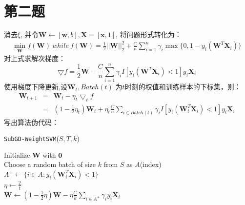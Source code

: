 \documentclass[UTF8]{ctexart}
\begin{document}
\newpage
\section{第二题}
\noindent
消去$\xi$, 并令$\textbf{W}\leftarrow[\textbf{w}, b], \textbf{X}=[\textbf{x}, 1]$,
将问题形式转化为：
\begin{eqnarray}
        \mathop{\min}_{\textbf{W}} f(\textbf{W})\ while\ f(\textbf{W}) = 
        \frac{1}{2} || \textbf{W}||^2_2 + 
        \frac{C}{n} \sum_{i=1}^{n} 
        \gamma_i \max \{ 0, 1-y_i(\textbf{W}^T\textbf{X}_i)\}
\end{eqnarray}
\noindent
对上式求解次梯度：
\begin{equation}
        \bigtriangledown f = \frac{1}{2} \textbf{W} -
        \frac{C}{n} \sum_{i=1}^{n} 
        \gamma_i I[y_i(\textbf{W}^T\textbf{X}_i)<1]y_i\textbf{X}_i
\end{equation}
\noindent
使用梯度下降更新,设$\textbf{W}_t, Batch(t)$ 为$t$时刻的权值和训练样本的下标集，则：
\begin{eqnarray}
        \textbf{W}_{t+1} &=& \textbf{W}_t - \eta_t \bigtriangledown_t f\\
        &=& (1-\frac{1}{2}\eta_t )\textbf{W}_t + 
        \eta_t \frac{C}{n} \sum_{i \in Batch(t)} 
        \gamma_i I[y_i(\textbf{W}_t^T\textbf{X}_i)<1]y_i\textbf{X}_i
\end{eqnarray}
\noindent
写出算法伪代码：

\begin{algorithm*}[H]
        \caption{\texttt{SubGD-WeightSVM}($S, T, k$)}
        Initialize $\textbf{W} $ with $ \textbf{0}$\\
        {
        Choose a random batch of size $k$ from $S$ as $A$(index)\\
        $A^+ \leftarrow \{i \in A :y_i(\textbf{W}_i^T \textbf{X}_i) < 1\}$\\
        $\eta \leftarrow \frac{2}{t}$\\
        $\textbf{W} \leftarrow (1-\frac{1}{2}\eta )\textbf{W} - \eta \frac{C}{k} \sum_{i \in A^+} \gamma_i y_i\textbf{X}_i$
        }
\end{algorithm*}

\end{document}
